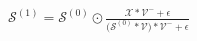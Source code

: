 \documentclass[border=3pt]{standalone}
\begin{document}
\color{navy}\Large
$\displaystyle \mathcal{S}^{(1)} = \mathcal{S}^{(0)} \odot \frac{\mathcal{X} \ast \mathcal{V}^{-} + \epsilon}{\bigl(\mathcal{S}^{(0)} \ast \mathcal{V}\bigr) \ast \mathcal{V}^{-} + \epsilon}$
\end{document}
